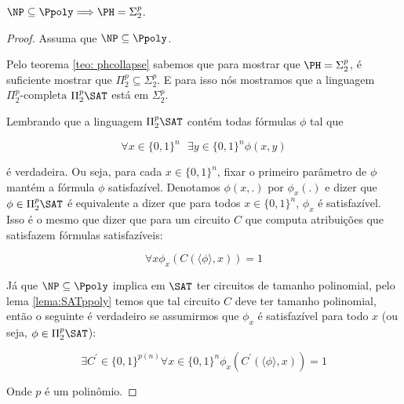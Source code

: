 \begin{teo}  \label{karp_lipton}

$\NP \subseteq \Ppoly \Longrightarrow \PH = \Sigma_{2}^{p}$.

\end{teo}

\begin{proof}

\hfill

Assuma que $\NP \subseteq \Ppoly$.

Pelo teorema \ref{teo: phcollapse} sabemos que para mostrar que $\PH = \Sigma_{2}^{p}$, é suficiente mostrar que $\Pi_{2}^{p} \subseteq \Sigma_{2}^{p}$. E para isso nós mostramos que a linguagem $\Pi_{2}^{p}\text{-completa}$ $\Pi_{2}^{p}\SAT$ está em $\Sigma_{2}^{p}$.

Lembrando que a linguagem $\Pi_{2}^{p}\SAT$ contém todas fórmulas $\phi$ tal que

\begin{equation} \label{eq:karplipton1}
    \forall x \in \{0, 1\}^{n} \text{ } \exists y \in \{0, 1\}^{n} \phi(x, y)
\end{equation}

é verdadeira. Ou seja, para cada $x \in \{0, 1\}^{n}$, fixar o primeiro parâmetro de $\phi$ mantém a fórmula $\phi$ satisfazível. Denotamos $\phi(x, .)$ por $\phi_{x}(.)$ e dizer que $\phi \in \Pi_{2}^{p}\SAT$ é equivalente a dizer que para todos $x \in \{0, 1\}^{n}$, $\phi_{x}$ é satisfazível. Isso é o mesmo que dizer que para um circuito $C$ que computa atribuições que satisfazem fórmulas satisfazíveis:

\begin{equation*}
\forall x \phi_{x}(C(\langle \phi \rangle, x)) = 1
\end{equation*}

Já que $\NP \subseteq \Ppoly$ implica em $\SAT$ ter circuitos de tamanho polinomial, pelo lema \ref{lema:SATppoly} temos que tal circuito $C$ deve ter tamanho polinomial, então o seguinte é verdadeiro se assumirmos que $\phi_{x}$ é satisfazível para todo $x$ (ou seja, $\phi \in \Pi_{2}^{p}\SAT$):

\begin{equation} \label{eq:karplipton2}
\exists C^{\prime} \in \{0, 1\}^{p(n)} \forall x \in \{0, 1\}^{n} \phi_{x}(C^{\prime}(\langle \phi \rangle, x)) = 1
\end{equation}

Onde $p$ é um polinômio.


\end{proof}
